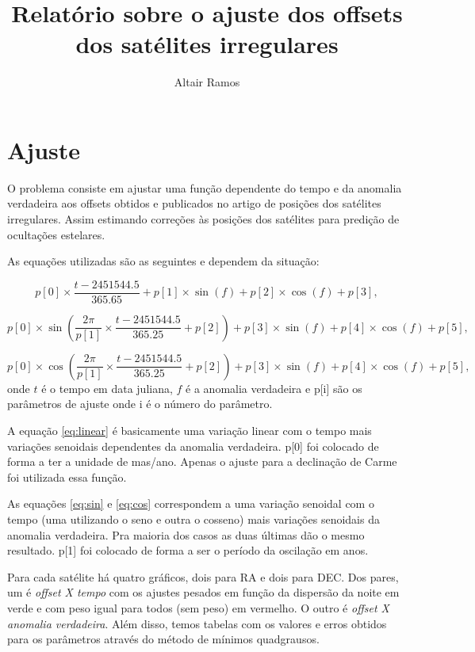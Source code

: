\documentclass[11pt,a4paper]{report}
\title{Relatório sobre o ajuste dos offsets dos satélites irregulares}
\author{Altair Ramos}
\begin{document}
\maketitle

\chapter*{Ajuste}

\indent \indent O problema consiste em ajustar uma função dependente do tempo e da anomalia verdadeira aos offsets obtidos e publicados no artigo de posições dos satélites irregulares. Assim estimando correções às posições dos satélites para predição de ocultações estelares.

As equações utilizadas são as seguintes e dependem da situação:

\begin{equation}
p[0]\times \frac{t - 2451544.5}{365.65} + p[1]\times \sin(f) + p[2]\times\cos(f) + p[3],
\label{eq:linear}
\end{equation}

\begin{equation}
p[0]\times\sin\left(\frac{2\pi}{p[1]}\times \frac{t - 2451544.5}{365.25} + p[2]\right) + p[3]\times\sin(f) + p[4]\times\cos(f) + p[5],
\label{eq:sin}
\end{equation}

\begin{equation}
p[0]\times\cos\left(\frac{2\pi}{p[1]}\times \frac{t - 2451544.5}{365.25} + p[2]\right) + p[3]\times\sin(f) + p[4]\times\cos(f) + p[5],
\label{eq:cos}
\end{equation}
onde $t$ é o tempo em data juliana, $f$ é a anomalia verdadeira e p[i] são os parâmetros de ajuste onde i é o número do parâmetro.

A equação \ref{eq:linear} é basicamente uma variação linear com o tempo mais variações senoidais dependentes da anomalia verdadeira. p[0] foi colocado de forma a ter a unidade de mas/ano. Apenas o ajuste para a declinação de Carme foi utilizada essa função.

As equaç\~oes \ref{eq:sin} e \ref{eq:cos} correspondem a uma variação senoidal com o tempo (uma utilizando o seno e outra o cosseno) mais variações senoidais da anomalia verdadeira. Pra maioria dos casos as duas últimas dão o mesmo resultado. p[1] foi colocado de forma a ser o período da oscilação em anos.

Para cada satélite há quatro gráficos, dois para RA e dois para DEC. Dos pares, um é \textit{offset X tempo} com os ajustes pesados em função da dispersão da noite em verde e com peso igual para todos (sem peso) em vermelho. O outro é \textit{offset X anomalia verdadeira}. Além disso, temos tabelas com os valores e erros obtidos para os parâmetros através do método de mínimos quadgrausos.
\end{document}
